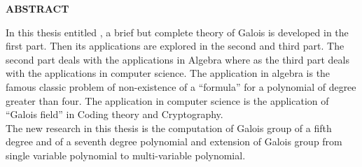 \begin{center}
{\Large{\bfseries ABSTRACT}}
\end{center}
\vspace{0.7cm}

In this thesis entitled \textcolor{blue}{\thetitle}, a brief but complete theory of Galois is developed in the first part. Then its applications are explored in the second and third part. The second part deals with the applications in Algebra where as the third part deals with the applications in computer science. The application in algebra is the famous classic problem of non-existence of a ``formula'' for a polynomial of degree greater than four. The application in computer science is the application of ``Galois field'' in Coding theory and Cryptography.\\

The new research in this thesis is the computation of Galois group of a fifth degree and of a seventh degree polynomial and extension of Galois group from single variable polynomial to multi-variable polynomial.

\clearpage